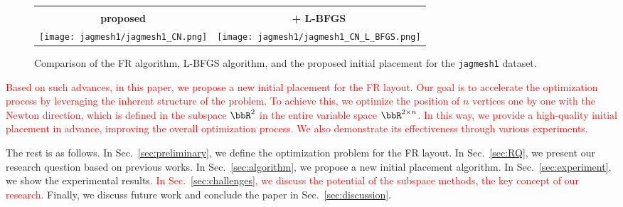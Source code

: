\documentclass[dvipdfmx,10pt,journal,compsoc]{IEEEtran}
\newcommand{\red}[1]{\textcolor{red}{#1}}
\begin{document}
\begin{figure}[t]
\begin{tabular}{cc}
\begin{minipage}{0.45\columnwidth}
        \end{minipage}                                   \\
        \large{\textbf{\textsf{proposed}}}                                 & \large{\textbf{\textsf{+ L-BFGS}}} \\
        \begin{minipage}{0.45\columnwidth}
            \centering
            \texttt{[image: jagmesh1/jagmesh1\_CN.png]}
        \end{minipage}
                                                                           &
        \begin{minipage}{0.45\columnwidth}
            \centering
            \texttt{[image: jagmesh1/jagmesh1\_CN\_L\_BFGS.png]}
        \end{minipage}
    \end{tabular}
    \caption{
        Comparison of the FR algorithm, L-BFGS algorithm, and the proposed initial placement for the \texttt{jagmesh1} dataset.}
    \label{table:four_images}
\end{figure}

\red{
    Based on such advances, in this paper, we propose a new initial placement for the FR layout.
    Our goal is to accelerate the optimization process by leveraging the inherent structure of the problem.
    To achieve this, we optimize the position of $n$ vertices one by one with the Newton direction, which is defined in the subspace $\bbR^2$ in the entire variable space $\bbR^{2 \times n}$.
    In this way, we provide a high-quality initial placement in advance, improving the overall optimization process.
    We also demonstrate its effectiveness through various experiments.
}

The rest is as follows.
In Sec.~\ref{sec:preliminary}, we define the optimization problem for the FR layout.
In Sec.~\ref{sec:RQ}, we present our research question based on previous works.
In Sec.~\ref{sec:algorithm}, we propose a new initial placement algorithm.
In Sec.~\ref{sec:experiment}, we show the experimental results.
\red{In Sec.~\ref{sec:challenges}, we discuss the potential of the subspace methods, the key concept of our research.}
Finally, we discuss future work and conclude the paper in Sec.~\ref{sec:discussion}.
\end{document}
